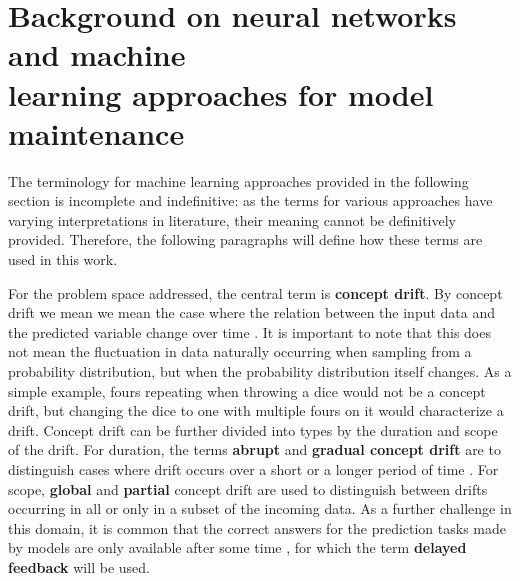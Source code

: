 \section[Background on neural networks and machine learning approaches for model maintenance]{Background on neural networks and machine\\ learning approaches for model maintenance}


The terminology for machine learning approaches provided in the following section is incomplete and indefinitive: as the terms for various approaches have varying interpretations in literature, their meaning cannot be definitively provided. Therefore, the following paragraphs will define how these terms are used in this work.

For the problem space addressed, the central term is \textbf{concept drift}. By concept drift we mean we mean the case where the relation between the input
data and the predicted variable change over time \cite{conceptdriftsurvey} \cite{schlimmerIncrementalLearningNoisy1986}. It is important to note that this does not mean the fluctuation in data naturally occurring when sampling from a probability distribution, but when the probability distribution itself changes. As a simple example, fours repeating when throwing a dice would not be a concept drift, but changing the dice to one with multiple fours on it would characterize a drift. Concept drift can be further divided into types by the duration and scope of the drift. For duration, the terms \textbf{abrupt} and \textbf{gradual concept drift} are to distinguish cases where drift occurs over a short or a longer period of time \cite{zliobaiteAdaptiveTrainingSet2010}. For scope, \textbf{global} and \textbf{partial} concept drift are used to distinguish between drifts occurring in all or only in a subset of the incoming data. As a further challenge in this domain, it is common that the correct answers for the prediction tasks made by models are only available after some time \cite{delayedlabelstreams}, for which the term  \textbf{delayed feedback} will be used. 


